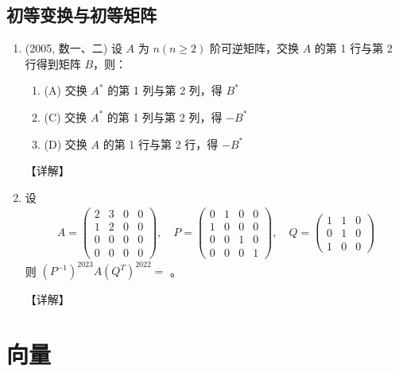 \documentclass[12pt, a4paper, oneside, UTF8]{ctexbook}
\begin{document}
\subsection{初等变换与初等矩阵}

\begin{enumerate}[label=\arabic*.,start=10]
    \item (2005, 数一、二) 设 $ A $ 为 $ n(n \geq 2) $ 阶可逆矩阵，交换 $ A $ 的第 1 行与第 2 行得到矩阵 $ B $，则：
    \begin{enumerate}
        \item (A) 交换 $ A^* $ 的第 1 列与第 2 列，得 $ B^* $
        \item (C) 交换 $ A^* $ 的第 1 列与第 2 列，得 $ -B^* $
        \item (D) 交换 $ A $ 的第 1 行与第 2 行，得 $ -B^* $
    \end{enumerate}
    
    \begin{solution}
    【详解】
    \end{solution}
    
    \item 设 
    \begin{align*}
    A = \begin{pmatrix}
    2 & 3 & 0 & 0 \\
    1 & 2 & 0 & 0 \\
    0 & 0 & 0 & 0 \\
    0 & 0 & 0 & 0
    \end{pmatrix}, \quad
    P = \begin{pmatrix}
    0 & 1 & 0 & 0 \\
    1 & 0 & 0 & 0 \\
    0 & 0 & 1 & 0 \\
    0 & 0 & 0 & 1
    \end{pmatrix}, \quad
    Q = \begin{pmatrix}
    1 & 1 & 0 \\
    0 & 1 & 0 \\
    1 & 0 & 0
    \end{pmatrix}
    \end{align*}
    则 $ (P^{-1})^{2023} A (Q^T)^{2022} = $ \underline{\hspace{3cm}}。
    
    \begin{solution}
    【详解】
    \end{solution}
\end{enumerate}

\section{向量}
\end{document}
